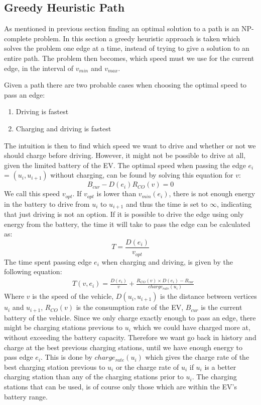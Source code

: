 \subsection{Greedy Heuristic Path}\label{sec:greedy}
As mentioned in previous section finding an optimal solution to a path is an NP-complete problem. In this section a greedy heuristic approach is taken which solves the problem one edge at a time, instead of trying to give a solution to an entire path. The problem then becomes, which speed must we use for the current edge, in the interval of $v_{min}$ and $v_{max}$.

Given a path there are two probable cases when choosing the optimal speed to pass an edge:
\begin{enumerate}
	\item Driving is fastest
	\item Charging and driving is fastest
\end{enumerate}

The intuition is then to find which speed we want to drive and whether or not we should charge before driving. However, it might not be possible to drive at all, given the limited battery of the EV. The optimal speed when passing the edge $e_i$ = $(u_i, u_{i+1})$ without charging, can be found by solving this equation for $v$:
\[B_{cur} - D(e_i)  R_{CO}(v) = 0\] 
We call this speed $v_{opt}$. If $v_{opt}$ is lower than $v_{min}(e_i)$, there is not enough energy in the battery to drive from $u_i$ to $u_{i+1}$ and thus the time is set to $\infty$, indicating that just driving is not an option. If it is possible to drive the edge using only energy from the battery, the time it will take to pass the edge can be calculated as:
 \[T = \frac{D(e_i)}{v_{opt}} \] 
The time spent passing edge $e_i$ when charging and driving, is given by the following equation:
\begin{equation*}
\begin{aligned}
 & T(v,e_i) = \frac{D(e_i)}{v} + \frac{R_{CO}(v) \times D(e_i) - B_{cur}}{charge_{rate}(u_{i})}
\end{aligned}
\end{equation*}
Where $v$ is the speed of the vehicle, $D(u_i, u_{i+1})$ is the distance between vertices $u_i$ and $u_{i+1}$, $R_{CO}(v)$ is the consumption rate of the EV, $B_{cur}$ is the current battery of the vehicle. Since we only charge exactly enough to pass an edge, there might be charging stations previous to $u_i$ which we could have charged more at, without exceeding the battery capacity. Therefore we want go back in history and charge at the best previous charging stations, until we have enough energy to pass edge $e_i$. This is done by $charge_{rate}(u_i)$ which gives the charge rate of the best charging station previous to $u_{i}$ or the charge rate of $u_i$ if $u_i$ is a better charging station than any of the charging stations prior to $u_i$. The charging stations that can be used, is of course only those which are within the EV's battery range.

